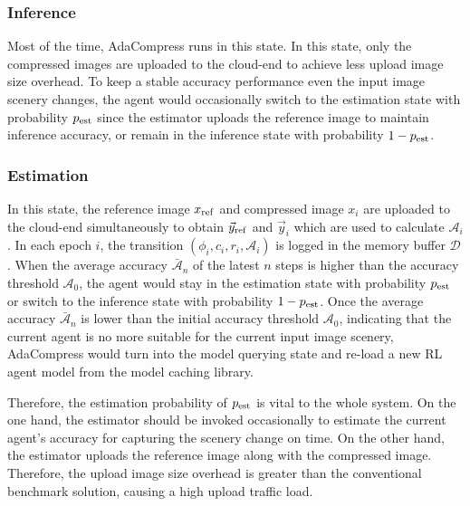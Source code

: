 \subsubsection{Inference}

Most of the time, AdaCompress runs in this state. In this state, only the compressed images are uploaded to the cloud-end to achieve less upload image size overhead. To keep a stable accuracy performance even the input image scenery changes, the agent would occasionally switch to the estimation state with probability $ p_{\rm est} $ since the estimator uploads the reference image to maintain inference accuracy, or remain in the inference state with probability $ 1 - p_{\rm est} $. %

\subsubsection{Estimation}

In this state, the reference image $ x_{\rm ref} $ and compressed image $ x_i $ are uploaded to the cloud-end simultaneously to obtain $ \vec{y}_{\rm ref} $ and $ \vec{y}_i $ which are used to calculate $ \mathcal{A}_i $. In each epoch $ i $, the transition $ (\phi_i, c_i, r_i, \mathcal{A}_i) $ is logged in the memory buffer $ \mathcal{D} $. When the average accuracy $ \bar{\mathcal{A}}_n $ of the latest $ n $ steps is higher than the accuracy threshold $ \mathcal{A}_0 $, the agent would stay in the estimation state with probability $ p_{\rm est} $ or switch to the inference state with probability $ 1 - p_{\rm est} $. Once the average accuracy $ \bar{\mathcal{A}}_n $ is lower than the initial accuracy threshold $ \mathcal{A}_0 $, indicating that the current agent is no more suitable for the current input image scenery, AdaCompress would turn into the model querying state and re-load a new RL agent model from the model caching library. %

Therefore, the estimation probability of $ p_{\rm est} $ is vital to the whole system. On the one hand, the estimator should be invoked occasionally to estimate the current agent's accuracy for capturing the scenery change on time. On the other hand, the estimator uploads the reference image along with the compressed image. Therefore, the upload image size overhead is greater than the conventional benchmark solution, causing a high upload traffic load. %

